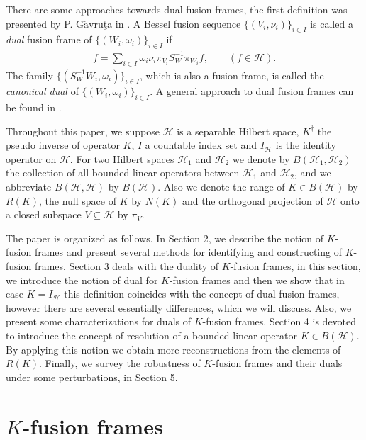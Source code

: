 \documentclass{birkjour}
\theoremstyle{definition}
\theoremstyle{remark}
\numberwithin{equation}{section}
\begin{document}
There are some approaches towards
 dual fusion frames, the
first definition  was presented by P.
G$\breve{\textrm{a}}$vru\c{t}a in \cite{Gav02}.
A Bessel fusion sequence $\{(V_i,\nu_i)\}_{i\in I}$ is
called a \textit{dual} fusion frame of $\{(W_i,\omega_i)\}_{i\in I}$ if
\begin{eqnarray}\label{Def:alt}
f=\sum_{i\in I}\omega_{i}\nu_{i}\pi_{V_i}S_{W}^{-1}\pi_{W_i}f,\qquad
(f\in \mathcal{H}).
\end{eqnarray}
The family $\{(S_{W}^{-1}W_i,\omega_i)\}_{i\in I}$, which is also a
fusion frame, is called the \textit{canonical dual} of
$\{(W_i,\omega_i)\}_{i\in I}$. A general approach to dual fusion frames can be found in \cite{Hei15, Hei14}.



Throughout this paper, we suppose  $\mathcal{H}$ is a separable Hilbert space, $K^{\dag}$ the pseudo inverse of operator $K$, $I$ a countable index set and $I_{\mathcal{H}}$ is the identity operator on $\mathcal{H}$. For two Hilbert spaces $\mathcal{H}_{1}$ and $\mathcal{H}_{2}$ we denote by $B(\mathcal{H}_{1},\mathcal{H}_{2})$ the collection of all bounded linear operators between $\mathcal{H}_{1}$ and $\mathcal{H}_{2}$, and we abbreviate $B(\mathcal{H},\mathcal{H})$ by $B(\mathcal{H})$. Also we denote the range of $K\in B(\mathcal{H})$ by $R(K)$, the null space of $K$ by $N(K)$ and the orthogonal projection of $\mathcal{H}$ onto a closed subspace $V \subseteq \mathcal{H}$  by $\pi_{V}$.



The paper is organized as follows. In
Section 2, we describe the notion of $K$-fusion frames and present several methods for  identifying and constructing of $K$-fusion frames.
 Section 3 deals with the duality of $K$-fusion frames, in this section, we introduce  the notion of  dual for $K$-fusion frames and then  we show that in case $K=I_{\mathcal{H}}$ this definition  coincides  with the concept of dual fusion frames, however there are several essentially differences, which we will discuss.  Also, we  present some characterizations for duals of  $K$-fusion frames. Section 4 is devoted to introduce the concept of resolution of a bounded linear operator $K\in B(\mathcal{H})$.  By applying this notion we  obtain more reconstructions from the elements of  $R(K)$.  Finally, we survey the  robustness of $K$-fusion frames and their duals under some perturbations,  in Section 5.


\smallskip
\goodbreak
\section{$K$-fusion frames}
\end{document}
